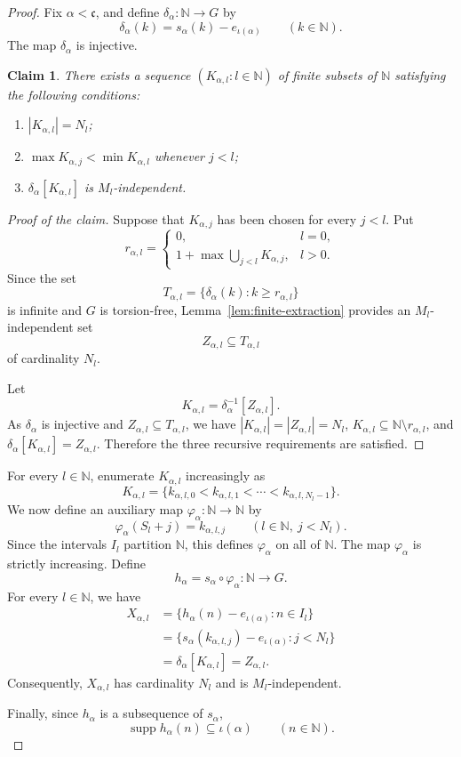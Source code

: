 \documentclass[11pt]{amsart}
\newtheorem*{claim}{Claim}
\theoremstyle{definition}
\newcommand{\N}{\mathbb N}
\newcommand{\cfrak}{\mathfrak c}
\newcommand{\supp}{\operatorname{supp}}
\begin{document}
\begin{proof}
Fix $\alpha<\cfrak$, and define $\delta_\alpha:\N\to G$
by
\[
\delta_\alpha(k)
=
s_\alpha(k)-e_{\iota(\alpha)}
\qquad(k\in\N).
\]
The map $\delta_\alpha$ is injective.

\begin{claim}
There exists a sequence $(K_{\alpha,l}:l\in\N)$ of finite subsets of $\N$
satisfying the following conditions:
\begin{enumerate}[label=(\alph*)]
\item $|K_{\alpha,l}|=N_l$;

\item $\max K_{\alpha,j}<\min K_{\alpha,l}$
whenever $j<l$;

\item $\delta_\alpha[K_{\alpha,l}]$ is $M_l$-independent.
\end{enumerate}
\end{claim}
\begin{proof}[Proof of the claim]
Suppose that $K_{\alpha,j}$ has been chosen for every $j<l$. Put
\[
r_{\alpha,l}
=
\begin{cases}
0,&l=0,\\[2mm]
1+\max\displaystyle\bigcup_{j<l}K_{\alpha,j},&l>0.
\end{cases}
\]
Since the set
\[
T_{\alpha,l}
=
\{\delta_\alpha(k):k\geq r_{\alpha,l}\}
\]
is infinite and $G$ is torsion-free, Lemma~\ref{lem:finite-extraction}
provides an $M_l$-independent set
\[
Z_{\alpha,l}\subseteq T_{\alpha,l}
\]
of cardinality $N_l$.

Let
\[
K_{\alpha,l}
=
\delta_\alpha^{-1}[Z_{\alpha,l}].
\]
As $\delta_\alpha$ is injective and
$Z_{\alpha,l}\subseteq T_{\alpha,l}$, we have
$|K_{\alpha,l}|=|Z_{\alpha,l}|=N_l$,
$K_{\alpha,l}\subseteq\N\setminus r_{\alpha,l}$, and
$\delta_\alpha[K_{\alpha,l}]=Z_{\alpha,l}$.
Therefore the three recursive requirements are satisfied.
\end{proof}
For every $l\in\N$, enumerate $K_{\alpha,l}$ increasingly as
\[
K_{\alpha,l}
=
\{k_{\alpha,l,0}
  <k_{\alpha,l,1}
  <\cdots
  <k_{\alpha,l,N_l-1}\}.
\]
We now define an auxiliary map $\varphi_\alpha:\N\to\N$
by
\[
\varphi_\alpha(S_l+j)
=
k_{\alpha,l,j}
\qquad(l\in\N,\ j<N_l).
\]
Since the intervals $I_l$
partition $\N$, this defines $\varphi_\alpha$ on all of $\N$.  The map
$\varphi_\alpha$ is strictly increasing.
Define
\[
h_\alpha=s_\alpha\circ \varphi_\alpha:\N\to G.
\]
For every $l\in\N$, we have
\[
\begin{aligned}
X_{\alpha,l}
&=
\{h_\alpha(n)-e_{\iota(\alpha)}:n\in I_l\}\\
&=
\{s_\alpha(k_{\alpha,l,j})-e_{\iota(\alpha)}:j<N_l\}\\
&=
\delta_\alpha[K_{\alpha,l}]
=
Z_{\alpha,l}.
\end{aligned}
\]
Consequently, $X_{\alpha,l}$ has cardinality $N_l$ and is
$M_l$-independent.

Finally, since $h_\alpha$ is a subsequence of $s_\alpha$,
\[
\supp h_\alpha(n)\subseteq\iota(\alpha)
\qquad(n\in\N).
\]
\end{proof}
\end{document}
